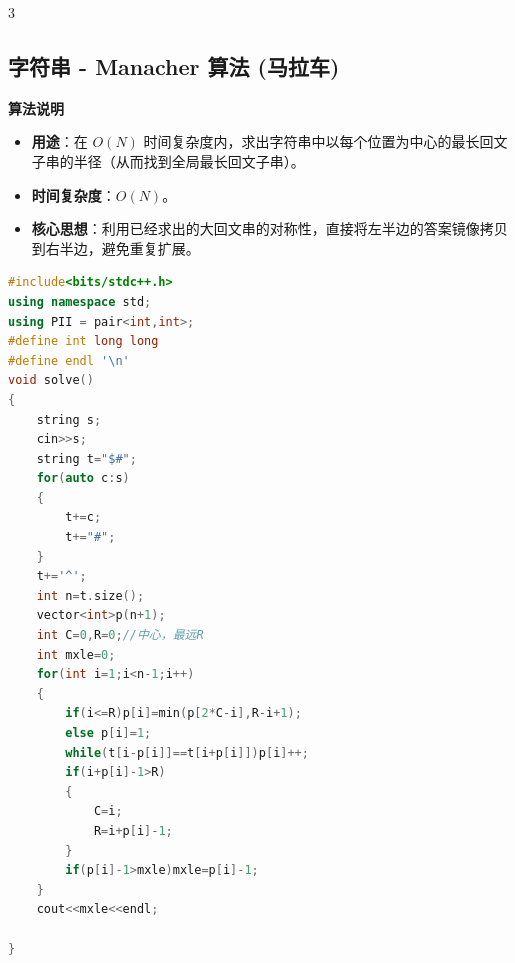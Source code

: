 \documentclass[10pt,landscape,a4paper]{article}
\begin{document}
\begin{multicols*}{3}
\subsection*{字符串 - Manacher 算法 (马拉车)}
\par\addvspace{0.7ex}\noindent\textbf{算法说明}\par\nobreak
\begin{itemize}
\item \textbf{用途}：在 $O(N)$ 时间复杂度内，求出字符串中以每个位置为中心的最长回文子串的半径（从而找到全局最长回文子串）。
\item \textbf{时间复杂度}：$O(N)$。
\item \textbf{核心思想}：利用已经求出的大回文串的对称性，直接将左半边的答案镜像拷贝到右半边，避免重复扩展。
\end{itemize}
\par{}\par
\begin{lstlisting}[language=C++]
#include<bits/stdc++.h>
using namespace std;
using PII = pair<int,int>;
#define int long long
#define endl '\n'
void solve()
{
    string s;
    cin>>s;
    string t="$#";
    for(auto c:s)
    {
        t+=c;
        t+="#";
    }
    t+='^';
    int n=t.size();
    vector<int>p(n+1);
    int C=0,R=0;//中心，最远R
    int mxle=0;
    for(int i=1;i<n-1;i++)
    {
        if(i<=R)p[i]=min(p[2*C-i],R-i+1);
        else p[i]=1;
        while(t[i-p[i]]==t[i+p[i]])p[i]++;
        if(i+p[i]-1>R)
        {
            C=i;
            R=i+p[i]-1;
        }
        if(p[i]-1>mxle)mxle=p[i]-1;
    }
    cout<<mxle<<endl;

}
\end{lstlisting}

\end{multicols*}
\end{document}
